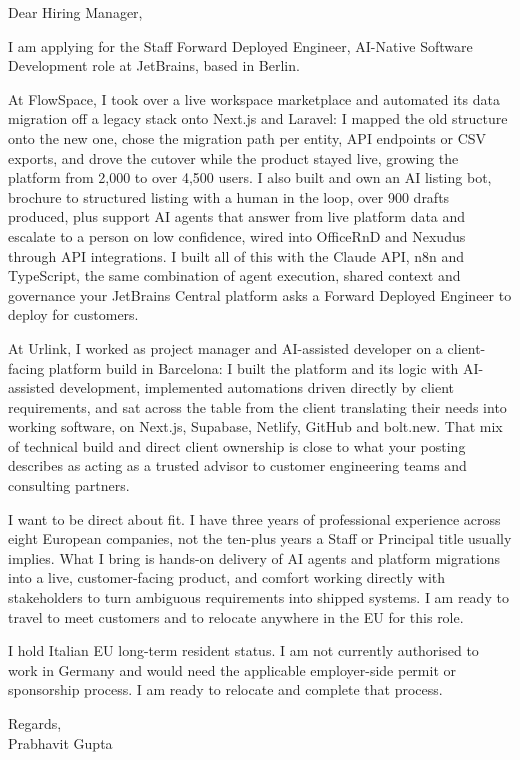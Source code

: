 \documentclass[a4paper,11pt]{article}
\begin{document}
Dear Hiring Manager,

I am applying for the Staff Forward Deployed Engineer, AI-Native Software Development role at JetBrains, based in Berlin.

At FlowSpace, I took over a live workspace marketplace and automated its data migration off a legacy stack onto Next.js and Laravel: I mapped the old structure onto the new one, chose the migration path per entity, API endpoints or CSV exports, and drove the cutover while the product stayed live, growing the platform from 2,000 to over 4,500 users. I also built and own an AI listing bot, brochure to structured listing with a human in the loop, over 900 drafts produced, plus support AI agents that answer from live platform data and escalate to a person on low confidence, wired into OfficeRnD and Nexudus through API integrations. I built all of this with the Claude API, n8n and TypeScript, the same combination of agent execution, shared context and governance your JetBrains Central platform asks a Forward Deployed Engineer to deploy for customers.

At Urlink, I worked as project manager and AI-assisted developer on a client-facing platform build in Barcelona: I built the platform and its logic with AI-assisted development, implemented automations driven directly by client requirements, and sat across the table from the client translating their needs into working software, on Next.js, Supabase, Netlify, GitHub and bolt.new. That mix of technical build and direct client ownership is close to what your posting describes as acting as a trusted advisor to customer engineering teams and consulting partners.

I want to be direct about fit. I have three years of professional experience across eight European companies, not the ten-plus years a Staff or Principal title usually implies. What I bring is hands-on delivery of AI agents and platform migrations into a live, customer-facing product, and comfort working directly with stakeholders to turn ambiguous requirements into shipped systems. I am ready to travel to meet customers and to relocate anywhere in the EU for this role.

I hold Italian EU long-term resident status. I am not currently authorised to work in Germany and would need the applicable employer-side permit or sponsorship process. I am ready to relocate and complete that process.

Regards,\\
Prabhavit Gupta
\end{document}
